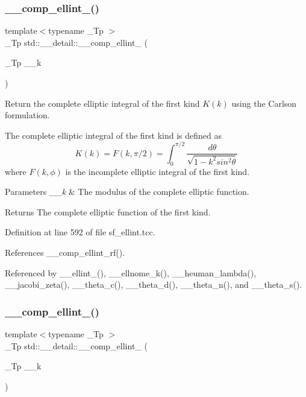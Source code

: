 \subsubsection{\texorpdfstring{\+\_\+\+\_\+comp\+\_\+ellint\+\_()}{\_\_comp\_ellint\_1()}}
{\footnotesize\ttfamily template$<$typename \+\_\+\+Tp $>$ \\
\+\_\+\+Tp std\+::\+\_\+\+\_\+detail\+::\+\_\+\+\_\+comp\+\_\+ellint\+\_ (\begin{DoxyParamCaption}\item[{\+\_\+\+Tp}]{\+\_\+\+\_\+k }\end{DoxyParamCaption})}



Return the complete elliptic integral of the first kind $ K(k) $ using the Carlson formulation. 

The complete elliptic integral of the first kind is defined as \[ K(k) = F(k,\pi/2) = \int_0^{\pi/2}\frac{d\theta} {\sqrt{1 - k^2 sin^2\theta}} \] where $ F(k,\phi) $ is the incomplete elliptic integral of the first kind.


\begin{DoxyParams}{Parameters}
{\em \+\_\+\+\_\+k} & The modulus of the complete elliptic function. \\
\hline
\end{DoxyParams}
\begin{DoxyReturn}{Returns}
The complete elliptic function of the first kind. 
\end{DoxyReturn}


Definition at line 592 of file sf\+\_\+ellint.\+tcc.



References \+\_\+\+\_\+comp\+\_\+ellint\+\_\+rf().



Referenced by \+\_\+\+\_\+ellint\+\_(), \+\_\+\+\_\+ellnome\+\_\+k(), \+\_\+\+\_\+heuman\+\_\+lambda(), \+\_\+\+\_\+jacobi\+\_\+zeta(), \+\_\+\+\_\+theta\+\_\+c(), \+\_\+\+\_\+theta\+\_\+d(), \+\_\+\+\_\+theta\+\_\+n(), and \+\_\+\+\_\+theta\+\_\+s().

\mbox{\label{namespacestd_1_1____detail_a4836f4db24abd037705100750f82d375}} 
\subsubsection{\texorpdfstring{\+\_\+\+\_\+comp\+\_\+ellint\+\_()}{\_\_comp\_ellint\_2()}}
{\footnotesize\ttfamily template$<$typename \+\_\+\+Tp $>$ \\
\+\_\+\+Tp std\+::\+\_\+\+\_\+detail\+::\+\_\+\+\_\+comp\+\_\+ellint\+\_ (\begin{DoxyParamCaption}\item[{\+\_\+\+Tp}]{\+\_\+\+\_\+k }\end{DoxyParamCaption})}



